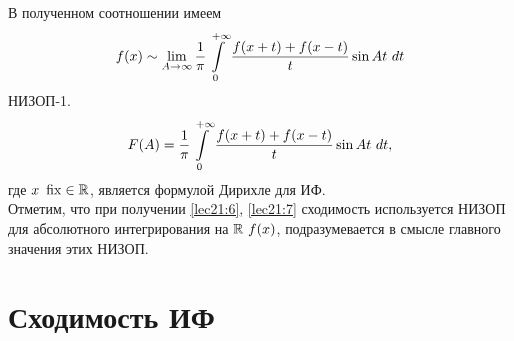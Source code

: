 \documentclass[../../main.tex]{subfiles}
\begin{document}
В полученном соотношении имеем
\begin{equation}
\label{lec21:6}
f(x) \sim \lim\limits_{A \to \infty}
\dfrac{1}{\pi} \int\limits_{0}^{+\infty} \dfrac{f(x + t) + f(x - t)}{t} \sin 
At\ dt
\end{equation} НИЗОП-1.
\begin{equation}
\label{lec21:7}
F(A) = \dfrac{1}{\pi} \int\limits_{0}^{+\infty} 
\dfrac{f(x + t) + f(x - t)}{t} \sin At\ dt,
\end{equation}
где $ x\ \operatorname{fix}\in \mathbb{R} $, является формулой Дирихле для ИФ.\\
Отметим, что при получении \eqref{lec21:6}, \eqref{lec21:7}
сходимость используется НИЗОП 
для абсолютного интегрирования на $ \R\ f(x) $, подразумевается в смысле
главного значения этих НИЗОП. %

\section{Сходимость ИФ}
\end{document}
